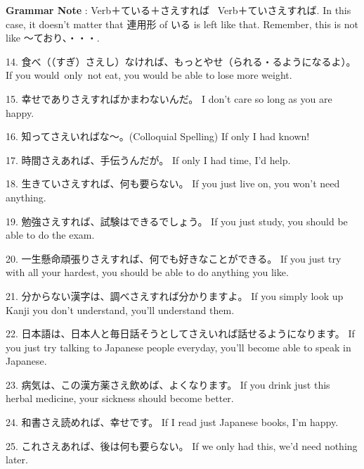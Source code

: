 \par{\textbf{Grammar Note }: Verb＋ている＋さえすれば  \textrightarrow  Verb＋ていさえすれば. In this case, it doesn't matter that 連用形 of いる is left like that. Remember, this is not like ～ており、・・・. }

\par{14. 食べ（（すぎ）さえし）なければ、もっとやせ（られる・るようになるよ）。 \hfill\break
If you would only not eat, you would be able to lose more weight. }

\par{15. 幸せでありさえすればかまわないんだ。 \hfill\break
I don't care so long as you are happy. }

\par{16. 知ってさえいればな～。(Colloquial Spelling) \hfill\break
If only I had known! }

\par{17. 時間さえあれば、手伝うんだが。 \hfill\break
If only I had time, I'd help. }

\par{18. 生きていさえすれば、何も要らない。 \hfill\break
If you just live on, you won't need anything. }

\par{19. 勉強さえすれば、試験はできるでしょう。 \hfill\break
If you just study, you should be able to do the exam. }

\par{20. 一生懸命頑張りさえすれば、何でも好きなことができる。 \hfill\break
If you just try with all your hardest, you should be able to do anything you like. }

\par{21. 分からない漢字は、調べさえすれば分かりますよ。 \hfill\break
If you simply look up Kanji you don't understand, you'll understand them. }

\par{22. 日本語は、日本人と毎日話そうとしてさえいれば話せるようになります。 \hfill\break
If you just try talking to Japanese people everyday, you'll become able to speak in Japanese. }

\par{23. 病気は、この漢方薬さえ飲めば、よくなります。 \hfill\break
If you drink just this herbal medicine, your sickness should become better. }

\par{24. 和書さえ読めれば、幸せです。 \hfill\break
If I read just Japanese books, I'm happy. }

\par{25. これさえあれば、後は何も要らない。 \hfill\break
If we only had this, we'd need nothing later. }

